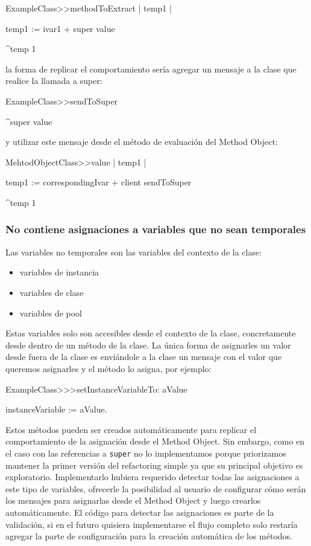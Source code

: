 \begin{code}
ExampleClass>>methodToExtract
    | temp1 |

    temp1 := ivar1 + super value

    ^temp 1
\end{code}

la forma de replicar el comportamiento sería agregar un mensaje a la clase que realice la llamada a super:

\begin{code}
ExampleClass>>sendToSuper

    ^super value
\end{code}

y utilizar este mensaje desde el método de evaluación del Method Object:

\begin{code}
MehtodObjectClass>>value
    | temp1 |

    temp1 := correspondingIvar + client sendToSuper

    ^temp 1
\end{code}


\subsubsection*{No contiene asignaciones a variables que no sean temporales}

Las variables no temporales son las variables del contexto de la clase:

\begin{itemize}
    \item variables de instancia
    \item variables de clase
    \item variables de pool
\end{itemize}

Estas variables solo son accesibles desde el contexto de la clase, concretamente desde dentro de
un método de la clase. La única forma de asignarles un valor desde fuera de la clase es enviándole
a la clase un mensaje con el valor que queremos asignarles y el método lo asigna, por ejemplo:

\begin{code}
ExampleClass>>>setInstanceVariableTo: aValue

    instanceVariable := aValue.
\end{code}

Estos métodos pueden ser creados automáticamente para replicar el comportamiento de la asignación
desde el Method Object. Sin embargo, como en el caso con las referencias a \lstinline{super} no lo
implementamos porque priorizamos mantener la primer versión del refactoring simple ya que su principal
objetivo es exploratorio. Implementarlo hubiera requerido detectar todas las asignaciones a este tipo 
de variables, ofrecerle la posibilidad al usuario de configurar cómo serán los mensajes para asignarlas
desde el Method Object y luego crearlos automáticamente. El código para detectar las asignaciones
es parte de la validación, si en el futuro quisiera implementarse el flujo completo solo restaría
agregar la parte de configuración para la creación automática de los métodos.



